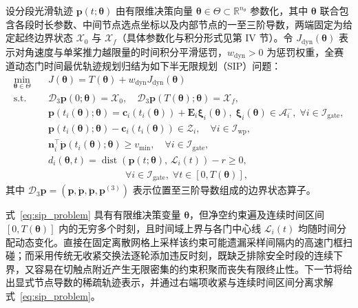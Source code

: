\documentclass[journal]{IEEEtran}
\begin{document}
设分段光滑轨迹 $\mathbf{p}(t; \boldsymbol{\theta})$ 由有限维决策向量 $\boldsymbol{\theta} \in \Theta \subset \mathbb{R}^{n_\theta}$ 参数化，其中 $\boldsymbol{\theta}$ 联合包含各段时长参数、中间节点选点坐标以及内部节点的一至三阶导数，两端固定为给定起终边界状态 $\mathcal{X}_0$ 与 $\mathcal{X}_f$（具体参数化与积分形式见第 IV 节）。令 $J_{\mathrm{dyn}}(\boldsymbol{\theta})$ 表示对角速度与单桨推力越限量的时间积分平滑惩罚，$w_{\mathrm{dyn}} > 0$ 为惩罚权重，全赛道动态门时间最优轨迹规划归结为如下半无限规划（SIP）问题：
\begin{equation}
\begin{aligned}
\min_{\boldsymbol{\theta} \in \Theta} \quad & J(\boldsymbol{\theta}) = T(\boldsymbol{\theta}) + w_{\mathrm{dyn}} J_{\mathrm{dyn}}(\boldsymbol{\theta}) \\
\mathrm{s.t.} \quad & \mathcal{D}_3 \mathbf{p}(0; \boldsymbol{\theta}) = \mathcal{X}_0, \quad \mathcal{D}_3 \mathbf{p}(T(\boldsymbol{\theta}); \boldsymbol{\theta}) = \mathcal{X}_f, \\
& \mathbf{p}(t_i(\boldsymbol{\theta}); \boldsymbol{\theta}) = \mathbf{c}_i(t_i(\boldsymbol{\theta})) + \mathbf{E}_i \boldsymbol{\xi}_i(\boldsymbol{\theta}), \; \boldsymbol{\xi}_i(\boldsymbol{\theta}) \in \mathcal{A}_i^-, \; \forall i \in \mathcal{I}_{\mathrm{gate}}, \\
& \mathbf{p}(t_i(\boldsymbol{\theta}); \boldsymbol{\theta}) - \mathbf{c}_i(t_i(\boldsymbol{\theta})) \in \mathcal{Z}_i, \quad \forall i \in \mathcal{I}_{\mathrm{wp}}, \\
& \mathbf{n}_i^\top \dot{\mathbf{p}}(t_i(\boldsymbol{\theta}); \boldsymbol{\theta}) \ge v_{\min}, \quad \forall i \in \mathcal{I}_{\mathrm{gate}}, \\
& d_i(\boldsymbol{\theta}, t) = \operatorname{dist}\!\left(\mathbf{p}(t; \boldsymbol{\theta}),\, \mathcal{L}_i(t)\right) - r \ge 0, \\
& \qquad\qquad\qquad\qquad \forall i \in \mathcal{I}_{\mathrm{gate}}, \; \forall t \in [0, T(\boldsymbol{\theta})],
\end{aligned}
\label{eq:sip_problem}
\end{equation}
其中 $\mathcal{D}_3 \mathbf{p} = (\mathbf{p}, \dot{\mathbf{p}}, \ddot{\mathbf{p}}, \mathbf{p}^{(3)})$ 表示位置至三阶导数组成的边界状态算子。

式~\eqref{eq:sip_problem} 具有有限维决策变量 $\boldsymbol{\theta}$，但净空约束遍及连续时间区间 $[0, T(\boldsymbol{\theta})]$ 内的无穷多个时刻，且时间域上界与各门中心线 $\mathcal{L}_i(t)$ 均随时间分配动态变化。直接在固定离散网格上采样该约束可能遗漏采样间隔内的高速门框扫碰；而采用传统无收紧交换法逐轮添加违反时刻，既缺乏排除安全时段的连续下界，又容易在切触点附近产生无限密集的约束积聚而丧失有限终止性。下一节将给出显式节点导数的稀疏轨迹表示，并通过右端项收紧与连续时间区间分离求解式~\eqref{eq:sip_problem}。
\end{document}
